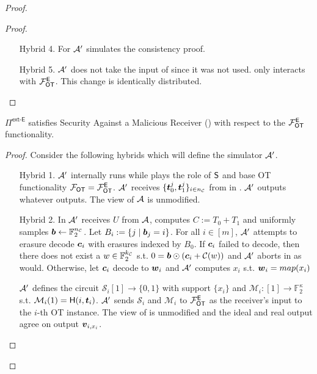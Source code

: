 \begin{proof}
\begin{proof}
\begin{enumerate}[leftmargin=1.8cm]
			\item[Hybrid 4.] For  $\mathcal{A}'$ simulates the consistency proof.
			
			\item[Hybrid 5.] $\mathcal{A}'$ does not take the input of \rec since it was not used. \rec only interacts with $\mathcal{F}_{\mathsf{OT}}^\mathsf{E}$. This change is identically distributed.
		\end{enumerate}
		\pe
	\end{proof}

	\begin{claim}\label{claim:ext-E-MalReceiver}
	$\Pi^\textsf{ext-E}$ satisfies Security Against a Malicious Receiver () with respect to the $\mathcal{F}_{\mathsf{OT}}^\mathsf{E}$ functionality.
	\end{claim}
	\begin{proof}
				Consider the following hybrids which will define the simulator $\mathcal{A}'$. 
		\begin{enumerate}[leftmargin=1.8cm]
			\item[Hybrid 1.] $\mathcal{A}'$ internally runs \Adv while plays the role of $\mathsf{S}$ and base OT functionality $\mathcal{F}_{\mathsf{OT}}=\mathcal{F}_{\mathsf{OT}}^\mathsf{E}$. $\mathcal{A}'$ receives $\{\boldsymbol{t}^j_0,\boldsymbol{t}^j_1\}_{i\in{n_\mathcal{C}}}$ from \Adv in . $\mathcal{A}'$ outputs whatever \Adv outputs. The view of $\mathcal{A}$ is unmodified.
			
			\item[Hybrid 2.] In  $\mathcal{A}'$ receives $U$ from $\mathcal{A}$, computes $C:=T_0+T_1$ and uniformly samples $\boldsymbol{b}\gets\mathbb{F}^{{n_\mathcal{C}}}_2$. Let  $B_i:=\{j \mid \boldsymbol{b}_j = i\}$. For all $i\in[m]$, $\mathcal{A}'$ attempts to erasure decode $\boldsymbol{c}_i$ with erasures indexed by $B_0$. If $\boldsymbol{c}_i$ failed to decode, then there does not exist a $w\in\mathbb{F}^{{k_\mathcal{C}}}_2$ s.t. $0=\boldsymbol{b}\odot (\boldsymbol{c}_i+\mathcal{C}(w))$ and $\mathcal{A}'$ aborts in  as \send would. Otherwise, let $\boldsymbol{c}_i$ decode to $\boldsymbol{w}_i$ and $\mathcal{A}'$ computes $x_i$ s.t. $\boldsymbol{w}_i=map(x_i)$
			
			
			$\mathcal{A}'$ defines the circuit $\mathcal{S}_i[1]\rightarrow\{0,1\}$ with support $\{x_i\}$ and $\mathcal{M}_i:[1]\rightarrow\mathbb{F}^\kappa_2$ s.t. $\mathcal{M}_i(1)=\mathsf{H}(i, \boldsymbol{t}_i)$. $\mathcal{A}'$ sends $\mathcal{S}_i$ and $\mathcal{M}_i$ to $\mathcal{F}_{\mathsf{OT}}^\mathsf{E}$ as the receiver's input to the $i$-th OT instance. The view of \Adv is unmodified and the ideal and real output agree on output $\boldsymbol{v}_{i,x_i}$.
			

\end{enumerate}
\end{proof}
\end{proof}
